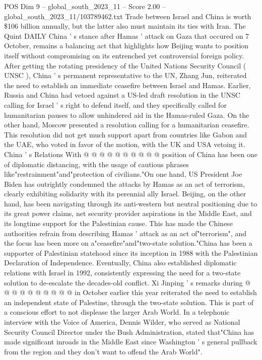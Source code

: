 \begin{textsample}{POS Dim 9 – global\_south\_2023\_11 – Score 2.00 – global\_south\_2023\_11/103789462.txt}  \label{ex:f9_pos_134}
Trade between Israel and China is worth \$106 billion annually, but the latter also must maintain its ties with Iran.
The Quint DAILY China ' s stance after Hamas ' attack on Gaza that occured on 7 October, remains a balancing act that highlights how Beijing wants to position itself without compromising on its entrenched yet controversial foreign policy.
After getting the rotating presidency of the United Nations Security Council ( UNSC ), China ' s permanent representative to the UN, Zhang Jun, reiterated the need to establish an immediate ceasefire between Israel and Hamas.
Earlier, Russia and China had vetoed against a US-led draft resolution in the UNSC calling for Israel ' s right to defend itself, and they specifically called for humanitarian pauses to allow unhindered aid in the Hamas-ruled Gaza.
On the other hand, Moscow presented a resolution calling for a humanitarian ceasefire.
This resolution did not get much support apart from countries like Gabon and the UAE, who voted in favor of the motion, with the UK and USA vetoing it.
China ' s Relations With @ @ @ @ @ @ @ @ @ @ position of China has been one of diplomatic distancing, with the usage of cautious phrases like"restrainment"and"protection of civilians."On one hand, US President Joe Biden has outrightly condemned the attacks by Hamas as an act of terrorism, clearly exhibiting solidarity with its perennial ally Israel.
Beijing, on the other hand, has been navigating through its anti-western but neutral positioning due to its great power claims, net security provider aspirations in the Middle East, and its longtime support for the Palestinian cause.
This has made the Chinese authorities refrain from describing Hamas ' attack as an act of"terrorism", and the focus has been more on a"ceasefire"and"two-state solution."China has been a supporter of Palestinian statehood since its inception in 1988 with the Palestinian Declaration of Independence.
Eventually, China also established diplomatic relations with Israel in 1992, consistently expressing the need for a two-state solution to de-escalate the decades-old conflict.
Xi Jinping ' s remarks during @ @ @ @ @ @ @ @ @ @ in October earlier this year reiterated the need to establish an independent state of Palestine, through the two-state solution.
This is part of a conscious effort to not displease the larger Arab World.
In a telephonic interview with the Voice of America, Dennis Wilder, who served as National Security Council Director under the Bush Administration, stated that"China has made significant inroads in the Middle East since Washington ' s general pullback from the region and they don't want to offend the Arab World".

\end{textsample}
